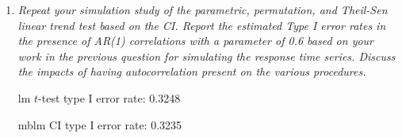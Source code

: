 \documentclass[11pt]{article}\usepackage[]{graphicx}\usepackage[]{color}
\makeatletter
\newcommand{\hlnum}[1]{\textcolor[rgb]{0,0,0}{#1}}%
\newcommand{\hlcom}[1]{\textcolor[rgb]{0.4,0.4,0.4}{\textit{#1}}}%
\newcommand{\hlopt}[1]{\textcolor[rgb]{0,0,0}{\textbf{#1}}}%
\newcommand{\hlstd}[1]{\textcolor[rgb]{0,0,0}{#1}}%
\newcommand{\hlkwb}[1]{\textcolor[rgb]{0,0,0}{\textbf{#1}}}%
\newcommand{\hlkwc}[1]{\textcolor[rgb]{0,0,0}{\textbf{#1}}}%
\newcommand{\hlkwd}[1]{\textcolor[rgb]{0,0,0}{\textbf{#1}}}%
\newenvironment{kframe}{%
 \def\at@end@of@kframe{}%
 \ifinner\ifhmode%
  \def\at@end@of@kframe{\end{minipage}}%
  \begin{minipage}{\columnwidth}%
 \fi\fi%
 \def\FrameCommand##1{\hskip\@totalleftmargin \hskip-\fboxsep
 \colorbox{shadecolor}{##1}\hskip-\fboxsep
     \hskip-\linewidth \hskip-\@totalleftmargin \hskip\columnwidth}%
 \MakeFramed {\advance\hsize-\width
   \@totalleftmargin\z@ \linewidth\hsize
   \@setminipage}}%
 {\par\unskip\endMakeFramed%
 \at@end@of@kframe}
\newenvironment{knitrout}{}{} %
\makeatother
\begin{document}
\begin{enumerate}
\begin{enumerate}
{\bf I must be doing something wrong, these are completely off.}


\begin{knitrout}\footnotesize
{}\color{fgcolor}\begin{kframe}
\begin{alltt}
\hlstd{sig3} \hlkwb{<-} \hlkwd{sqrt}\hlstd{((}\hlnum{1}\hlopt{-}\hlnum{0.3}\hlopt{^}\hlnum{2}\hlstd{))} \hlopt{*} \hlstd{resid.se}
\hlstd{sig6} \hlkwb{<-} \hlkwd{sqrt}\hlstd{((}\hlnum{1}\hlopt{-}\hlnum{0.6}\hlopt{^}\hlnum{2}\hlstd{))} \hlopt{*} \hlstd{resid.se}

\hlstd{ar1sim}\hlkwb{<-}\hlkwd{arima.sim}\hlstd{(}\hlkwc{n}\hlstd{=}\hlnum{2000}\hlstd{,}\hlkwc{model}\hlstd{=}\hlkwd{list}\hlstd{(}\hlkwc{ar}\hlstd{=}\hlkwd{c}\hlstd{(}\hlnum{0.3}\hlstd{)),}\hlkwc{sd}\hlstd{=sig3)}
\hlkwd{var}\hlstd{(ar1sim)}
\end{alltt}
\begin{verbatim}
[1] 0.00104929
\end{verbatim}
\begin{alltt}
\hlstd{ar1sim}\hlkwb{<-}\hlkwd{arima.sim}\hlstd{(}\hlkwc{n}\hlstd{=}\hlnum{2000}\hlstd{,}\hlkwc{model}\hlstd{=}\hlkwd{list}\hlstd{(}\hlkwc{ar}\hlstd{=}\hlkwd{c}\hlstd{(}\hlnum{0.6}\hlstd{)),}\hlkwc{sd}\hlstd{=sig6)}
\hlkwd{var}\hlstd{(ar1sim)} \hlcom{# about right :)}
\end{alltt}
\begin{verbatim}
[1] 0.001104394
\end{verbatim}
\end{kframe}
\end{knitrout}

Variance of $y_t$ using $\phi=0.6$ = 0.0011044

Residual variance from lm fit = 0.0010413

\end{enumerate}

\item%
{\it Repeat your simulation study of the parametric, permutation, and Theil-Sen linear trend test based on the CI. Report the estimated Type I error rates in the presence of AR(1) correlations with a parameter of 0.6 based on your work in the previous question for simulating the response time series. Discuss the impacts of having autocorrelation present on the various procedures.}



lm $t$-test type I error rate: 0.3248

mblm CI type I error rate: 0.3235


\end{enumerate}
\end{document}
